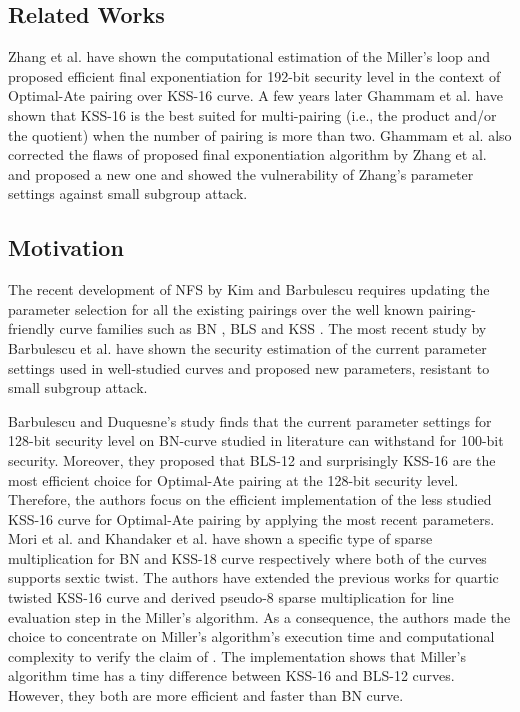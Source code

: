 \subsection{Related Works}
Zhang et al. \cite{INDOCRYPT:ZhaLin12} have shown the computational estimation of the Miller's loop and proposed efficient final exponentiation for 192-bit security level in the context of Optimal-Ate pairing over KSS-16 curve. 
A few years later Ghammam et al. \cite{EPRINT:GhaFou16b} have shown that KSS-16 is the best suited for multi-pairing (i.e., the product and/or the quotient) when the number of pairing is more than two. 
Ghammam et al. \cite{EPRINT:GhaFou16b} also corrected the flaws of proposed final exponentiation algorithm by Zhang et al. \cite{INDOCRYPT:ZhaLin12} and proposed a new one and showed the vulnerability of Zhang's parameter settings against small subgroup attack. 

\subsection{Motivation}
The recent development of NFS by Kim and Barbulescu \cite{C:KimBar16} requires updating the parameter selection for all the existing pairings over the well known pairing-friendly curve families such as BN \cite{SAC:BarNae05}, BLS \cite{EPRINT:FreScoTes06} and KSS \cite{EPRINT:KacSchSco07}.
The most recent study by Barbulescu et al. \cite{EPRINT:BarDuq17} have shown the security estimation of the current parameter settings used in well-studied curves and proposed new parameters, resistant to small subgroup attack.

Barbulescu and Duquesne's study finds that the current parameter settings for 128-bit security level on BN-curve studied in literature can withstand for 100-bit security. 
Moreover, they proposed that BLS-12 and surprisingly KSS-16 are the most efficient choice for Optimal-Ate pairing at the 128-bit security level. Therefore, the authors focus on the efficient implementation of the less studied KSS-16 curve for Optimal-Ate pairing by applying the most recent parameters.
Mori et al. \cite{PAIRING:MANS13} and Khandaker et al. \cite{ICISC:KONSD16} have shown a specific type of sparse multiplication for BN and KSS-18 curve respectively where both of the curves supports sextic twist. 
The authors have extended the previous works for quartic twisted KSS-16 curve and derived pseudo-8 sparse multiplication for line evaluation step in the Miller's algorithm. 
As a consequence, the authors made the choice to concentrate on Miller's algorithm's execution time and computational complexity to verify the claim of \cite{EPRINT:BarDuq17}.
The implementation shows that Miller's algorithm time has a tiny difference between KSS-16 and BLS-12 curves. However, they both are more efficient and faster than BN curve. 

